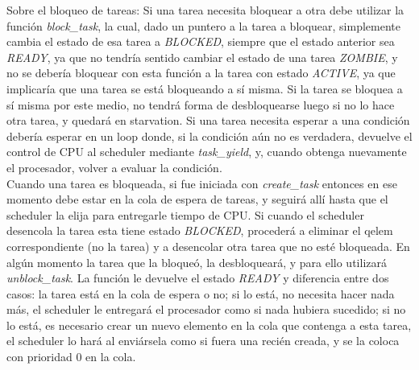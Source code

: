 \documentclass[a4paper]{article}
\begin{document}
Sobre el bloqueo de tareas: Si una tarea necesita bloquear a otra
debe utilizar la función \textit{block\_task}, la cual, dado un
puntero a la tarea a bloquear, simplemente cambia el estado de esa
tarea a \textit{BLOCKED}, siempre que el estado anterior sea
\textit{READY}, ya que no tendría sentido cambiar el estado de una
tarea \textit{ZOMBIE}, y no se debería bloquear con esta función
a la tarea con estado \textit{ACTIVE}, ya que implicaría que una
tarea se está bloqueando a sí misma. Si la tarea se bloquea a sí
misma por este medio, no tendrá forma de desbloquearse luego si
no lo hace otra tarea, y quedará en starvation. Si una tarea
necesita esperar a una condición debería esperar en un loop donde,
si la condición aún no es verdadera, devuelve el control de CPU
al scheduler mediante \textit{task\_yield}, y, cuando obtenga
nuevamente el procesador, volver a evaluar la condición. \\
Cuando una tarea es bloqueada, si fue iniciada con
\textit{create\_task} entonces en ese momento debe estar en la cola
de espera de tareas, y seguirá allí hasta que el scheduler la
elija para entregarle tiempo de CPU. Si cuando el scheduler
desencola la tarea esta tiene estado \textit{BLOCKED}, procederá
a eliminar el qelem correspondiente (no la tarea) y a
desencolar otra tarea que no esté bloqueada. En algún momento
la tarea que la bloqueó, la desbloqueará, y para ello utilizará
\textit{unblock\_task}. La función le devuelve el estado
\textit{READY} y diferencia entre dos casos: la tarea está en la
cola de espera o no; si lo está, no necesita hacer nada más, el
scheduler le entregará el procesador como si nada hubiera
sucedido; si no lo está, es necesario crear un nuevo elemento
en la cola que contenga a esta tarea, el scheduler lo hará al
enviársela como si fuera una recién creada, y se la coloca con
prioridad 0 en la cola.
\end{document}
